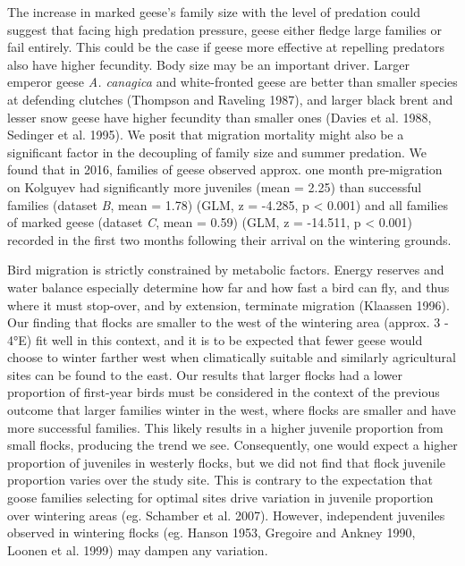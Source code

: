 \documentclass[10pt,twocolumn]{paper}
\begin{document}
The increase in marked geese's family size with the level of predation
could suggest that facing high predation pressure, geese either fledge
large families or fail entirely. This could be the case if geese more
effective at repelling predators also have higher fecundity. Body size
may be an important driver. Larger emperor geese \emph{A. canagica} and
white-fronted geese are better than smaller species at defending
clutches (Thompson and Raveling 1987), and larger black brent and lesser
snow geese have higher fecundity than smaller ones (Davies et al. 1988,
Sedinger et al. 1995). We posit that migration mortality might also be a
significant factor in the decoupling of family size and summer
predation. We found that in 2016, families of geese observed approx. one
month pre-migration on Kolguyev had significantly more juveniles (mean =
2.25) than successful families (dataset \emph{B}, mean = 1.78) (GLM, z =
-4.285, p \textless{} 0.001) and all families of marked geese (dataset
\emph{C}, mean = 0.59) (GLM, z = -14.511, p \textless{} 0.001) recorded
in the first two months following their arrival on the wintering
grounds.

Bird migration is strictly constrained by metabolic factors. Energy
reserves and water balance especially determine how far and how fast a
bird can fly, and thus where it must stop-over, and by extension,
terminate migration (Klaassen 1996). Our finding that flocks are smaller
to the west of the wintering area (approx. 3 - 4°E) fit well in this
context, and it is to be expected that fewer geese would choose to
winter farther west when climatically suitable and similarly
agricultural sites can be found to the east. Our results that larger
flocks had a lower proportion of first-year birds must be considered in
the context of the previous outcome that larger families winter in the
west, where flocks are smaller and have more successful families. This
likely results in a higher juvenile proportion from small flocks,
producing the trend we see. Consequently, one would expect a higher
proportion of juveniles in westerly flocks, but we did not find that
flock juvenile proportion varies over the study site. This is contrary
to the expectation that goose families selecting for optimal sites drive
variation in juvenile proportion over wintering areas (eg. Schamber et
al. 2007). However, independent juveniles observed in wintering flocks
(eg. Hanson 1953, Gregoire and Ankney 1990, Loonen et al. 1999) may
dampen any variation.
\end{document}
